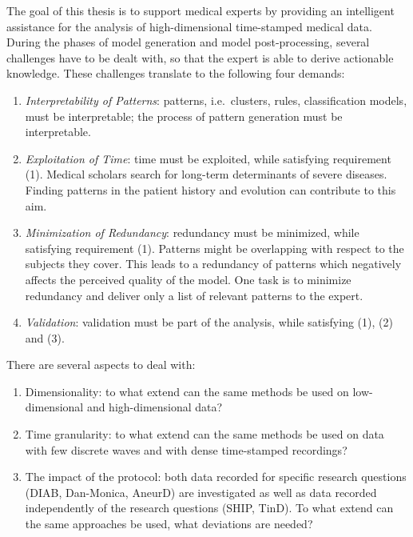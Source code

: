 \documentclass[
]{book}
\providecommand{\tightlist}{%
  \setlength{\itemsep}{0pt}\setlength{\parskip}{0pt}}
\begin{document}
The goal of this thesis is to support medical experts by providing an intelligent assistance for the analysis of high-dimensional time-stamped medical data.
During the phases of model generation and model post-processing, several challenges have to be dealt with, so that the expert is able to derive actionable knowledge. These challenges translate to the following four demands:

\begin{enumerate}
\def\labelenumi{(\arabic{enumi})}
\tightlist
\item
  \emph{Interpretability of Patterns}: patterns, i.e.~clusters, rules, classification models, must be interpretable; the process of pattern generation must be interpretable.
\item
  \emph{Exploitation of Time}: time must be exploited, while satisfying requirement (1).
  Medical scholars search for long-term determinants of severe diseases. Finding patterns in the patient history and evolution can contribute to this aim.
\item
  \emph{Minimization of Redundancy}: redundancy must be minimized, while satisfying requirement (1). Patterns might be overlapping with respect to the subjects they cover. This leads to a redundancy of patterns which negatively affects the perceived quality of the model. One task is to minimize redundancy and deliver only a list of relevant patterns to the expert.
\item
  \emph{Validation}: validation must be part of the analysis, while satisfying (1), (2) and (3).
\end{enumerate}

There are several aspects to deal with:

\begin{enumerate}
\def\labelenumi{\arabic{enumi}.}
\tightlist
\item
  Dimensionality: to what extend can the same methods be used on low-dimensional and high-dimensional data?
\item
  Time granularity: to what extend can the same methods be used on data with few discrete waves and with dense time-stamped recordings?
\item
  The impact of the protocol: both data recorded for specific research questions (DIAB, Dan-Monica, AneurD) are investigated as well as data recorded independently of the research questions (SHIP, TinD). To what extend can the same approaches be used, what deviations are needed?
\end{enumerate}
\end{document}

